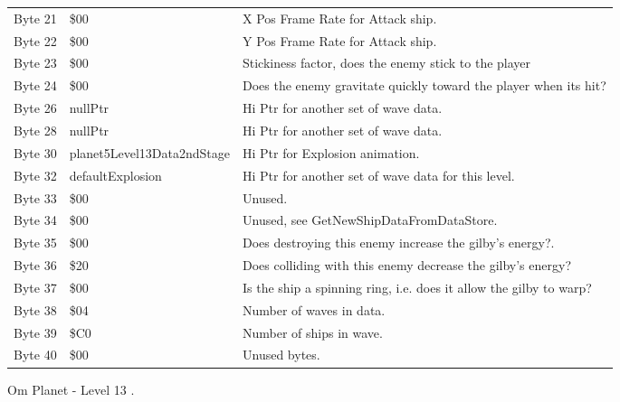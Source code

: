\begin{figure}[H]
{\begin{adjustbox}{width=12cm}
\begin{tabular}{lll}
 Byte 21 & \$00                        & X Pos Frame Rate for Attack ship.                                  \\
 Byte 22 & \$00                        & Y Pos Frame Rate for Attack ship.                                  \\
 Byte 23 & \$00                        & Stickiness factor, does the enemy stick to the player              \\
 Byte 24 & \$00                        & Does the enemy gravitate quickly toward the player when its hit?   \\
 Byte 26 & nullPtr                    & Hi Ptr for another set of wave data.                               \\
 Byte 28 & nullPtr                    & Hi Ptr for another set of wave data.                               \\
 Byte 30 & planet5Level13Data2ndStage & Hi Ptr for Explosion animation.                                    \\
 Byte 32 & defaultExplosion           & Hi Ptr for another set of wave data for this level.                \\
 Byte 33 & \$00                        & Unused.                                                            \\
 Byte 34 & \$00                        & Unused, see GetNewShipDataFromDataStore.                           \\
 Byte 35 & \$00                        & Does destroying this enemy increase the gilby's energy?.           \\
 Byte 36 & \$20                        & Does colliding with this enemy decrease the gilby's energy?        \\
 Byte 37 & \$00                        & Is the ship a spinning ring, i.e. does it allow the gilby to warp? \\
 Byte 38 & \$04                        & Number of waves in data.                                           \\
 Byte 39 & \$C0                        & Number of ships in wave.                                           \\
 Byte 40 & \$00                        & Unused bytes.                                                      \\
\bottomrule
\end{tabular}

  \end{adjustbox}

  }\caption*{Om Planet - Level 13
.}
\end{figure}

